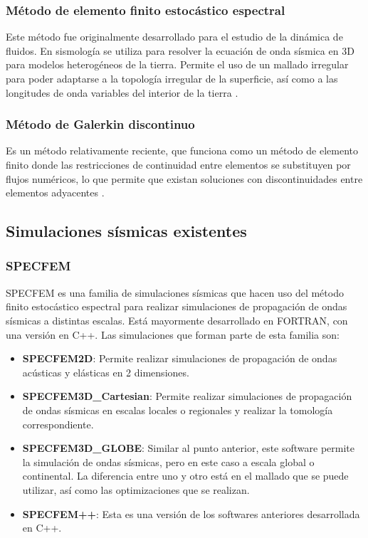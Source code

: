 \subsubsection{Método de elemento finito estocástico espectral}
Este método fue originalmente desarrollado para el estudio de la dinámica de fluidos. En sismología se utiliza para resolver la ecuación de onda sísmica en 3D para modelos heterogéneos de la tierra. Permite el uso de un mallado irregular para poder adaptarse a la topología irregular de la superficie, así como a las longitudes de onda variables del interior de la tierra \cite{Fichtner2011}.
\subsubsection{Método de Galerkin discontinuo}
Es un método relativamente reciente, que funciona como un método de elemento finito donde las restricciones de continuidad entre elementos se substituyen por flujos numéricos, lo que permite que existan soluciones con discontinuidades entre elementos adyacentes \cite{Fichtner2011}.
\subsection{Simulaciones sísmicas existentes}
\subsubsection{SPECFEM}
SPECFEM \cite{Peter_Forward_and_adjoint_2011} es una familia de simulaciones sísmicas que hacen uso del método finito estocástico espectral para realizar simulaciones de propagación de ondas sísmicas a distintas escalas. Está mayormente desarrollado en FORTRAN, con una versión en C++.
Las simulaciones que forman parte de esta familia son:
\begin{itemize}
  \item \textbf{SPECFEM2D}: Permite realizar simulaciones de propagación de ondas acústicas y elásticas en 2 dimensiones.
  \item \textbf{SPECFEM3D\_Cartesian}: Permite realizar simulaciones de propagación de ondas sísmicas en escalas locales o regionales y realizar la tomología correspondiente.
  \item \textbf{SPECFEM3D\_GLOBE}: Similar al punto anterior, este software permite la simulación de ondas sísmicas, pero en este caso a escala global o continental. La diferencia entre uno y otro está en el mallado que se puede utilizar, así como las optimizaciones que se realizan.
  \item \textbf{SPECFEM++}: Esta es una versión de los softwares anteriores desarrollada en C++. \end{itemize}
